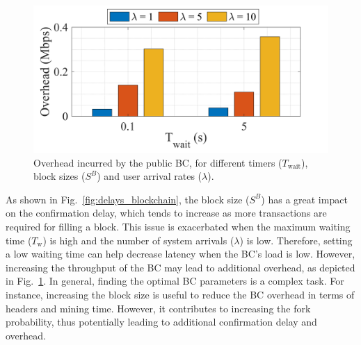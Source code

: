 \documentclass[conference]{IEEEtran}
\theoremstyle{definition}
\begin{document}
\begin{figure}[ht!]
\centering
\includegraphics[width=\columnwidth]{overhead_bc.png}
\caption{Overhead incurred by the public BC, for different timers ($T_\text{wait}$), block sizes ($S^B$) and user arrival rates ($\lambda$).}
\label{fig:overhead_bc}
\end{figure}

As shown in Fig.~\ref{fig:delays_blockchain}, the block size ($S^B$) has a great impact on the confirmation delay, which tends to increase as more transactions are required for filling a block. This issue is exacerbated when the maximum waiting time ($T_\text{w}$) is high and the number of system arrivals ($\lambda$) is low. Therefore, setting a low waiting time can help decrease latency when the BC's load is low. However, increasing the throughput of the BC may lead to additional overhead, as depicted in Fig.~\ref{fig:overhead_bc}. In general, finding the optimal BC parameters is a complex task. For instance, increasing the block size is useful to reduce the BC overhead in terms of headers and mining time. However, it contributes to increasing the fork probability, thus potentially leading to additional confirmation delay and overhead.
\end{document}
